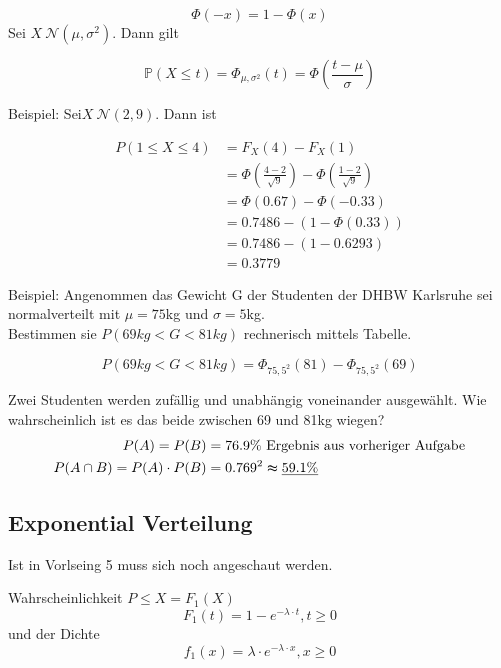 \[\Phi(-x)=1-\Phi(x)\]
Sei $X~\mathcal{N} (\mu,\sigma^2)$. Dann gilt

\[\mathbb{P} (X\leq t)=\Phi_{\mu ,\sigma ^2}(t)=\Phi\left( \frac{t-\mu}{\sigma} \right)\]

Beispiel: Sei$X~\mathcal{N} (2,9)$. Dann ist

\begin{align}
    P(1\leq X\leq 4)&=F_X(4)-F_X(1)\\
    &=\Phi\left(\frac{4-2}{\sqrt{9}}\right)-\Phi\left(\frac{1-2}{\sqrt{9} } \right)\\
    &=\Phi(0.67)-\Phi(-0.33)\\
    &=0.7486-(1-\Phi(0.33))\\
    &=0.7486-(1-0.6293)\\
    &=0.3779
\end{align}

Beispiel: Angenommen das Gewicht G der Studenten der DHBW Karlsruhe sei normalverteilt mit $\mu =75$kg und $\sigma=5$kg.\\

Bestimmen sie $P(69kg<G<81kg)$ rechnerisch mittels Tabelle.

\[P(69kg<G<81kg)=\Phi_{75,5^2}(81)-\Phi_{75,5^2}(69)\]

Zwei Studenten werden zufällig und unabhängig voneinander ausgewählt. Wie wahrscheinlich ist es das beide zwischen 69 und 81kg wiegen?
\begin{align}
    P(A)=P(B)&=76.9\%\textrm{ Ergebnis aus vorheriger Aufgabe}\\
    P(A\cap B)=P(A)\cdot P(B)&=0.769^2\thickapprox \underline{59.1\% }
\end{align}


\subsection{Exponential Verteilung}
Ist in Vorlseing 5 muss sich noch angeschaut werden.

Wahrscheinlichkeit $P\leq X = F_1(X)$
\[F_1(t) = 1- e^{-\lambda\cdot t},t\geq 0\]
und der Dichte
\[f_1(x) = \lambda \cdot e^{-\lambda \cdot x}, x\geq 0\]


